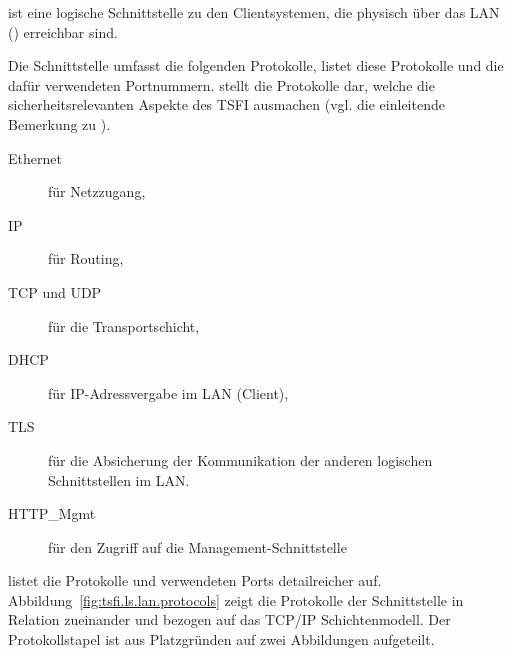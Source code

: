 
\lslan{} ist eine logische Schnittstelle zu den Clientsystemen, die physisch
über das LAN () erreichbar sind.

Die Schnittstelle umfasst die folgenden Protokolle,
 listet diese Protokolle und die dafür
verwendeten Portnummern.   stellt die
Protokolle dar, welche die sicherheitsrelevanten Aspekte des TSFI ausmachen
(vgl. die einleitende Bemerkung zu ).

\begin{description}
\item[Ethernet] für Netzzugang,
\item[IP] für Routing,	
\item[TCP und UDP] für die Transportschicht,
\item[DHCP] für IP-Adressvergabe im LAN (Client),
\item[TLS] für die Absicherung der Kommunikation der anderen logischen
  Schnittstellen im LAN.
\item[HTTP\_Mgmt] für den Zugriff auf die Management-Schnittstelle
\end{description}

 listet die Protokolle und verwendeten
Ports detailreicher auf. Abbildung~\vref{fig:tsfi.ls.lan.protocols} zeigt die
Protokolle der Schnittstelle \lslan{} in Relation zueinander und bezogen auf das
TCP/IP Schichtenmodell. Der Protokollstapel ist aus Platzgründen auf zwei
Abbildungen aufgeteilt.

\afterpage{%
  \clearpage%
  \begin{landscape}%
    \centering %
    {
      
    }
  \end{landscape}
  \clearpage%
}

